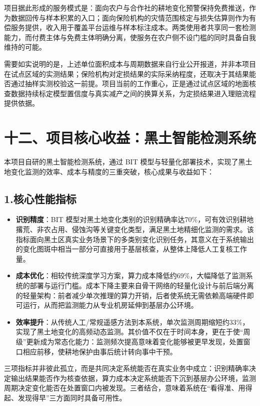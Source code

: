 \documentclass[12pt, a4paper]{ctexart}
\begin{document}
项目据此形成的服务模式是：面向农户与合作社的耕地变化预警保持免费推送，作为数据回传与样本积累的入口；面向保险机构的灾情范围核定与损失估算则作为有偿服务提供，收入用于覆盖平台运维与样本标注成本。两类使用者共享同一套检测能力，而付费主体与免费主体明确分离，使服务在农户侧不设门槛的同时具备自我维持的可能。

需要如实说明的是，上述单位面积成本与周期数据来自行业公开报道，并非本项目在试点区域的实测结果；保险机构对定损结果的实际采纳程度，还取决于其结果能否通过抽样实测校验这一前提。项目当前的工作重心，正是通过试点区域的地面核查数据持续标定模型置信度与真实减产之间的换算关系，为定损结果进入理赔流程提供依据。

\section{十二、项目核心收益：黑土智能检测系统}

本项目自研的黑土智能检测系统，通过 BIT 模型与轻量化部署技术，实现了黑土地变化监测的效率、成本与精度的三重突破，核心成果与收益如下：

\subsection{1.核心性能指标}

\begin{itemize}
  \item \textbf{识别精度}：BIT 模型对黑土地变化类别的识别精确率达70\%，可有效识别耕地撂荒、非农占用、侵蚀沟等关键变化类型，满足黑土地精细化监测的需求。该指标面向黑土区真实业务场景下的多类别变化识别任务，其意义在于系统输出的变化图斑中相当一部分可直接用于基层核查，从整体上降低人工复核工作量。
  \item \textbf{成本优化}：相较传统深度学习方案，算力成本降低约69\%，大幅降低了监测系统的部署与运行门槛。成本下降主要来自骨干网络的轻量化设计与前后端分离的轻量架构：前者减少单次推理的算力开销，后者使系统无需依赖高端硬件即可运行，从而把监测能力从专业机房延伸到基层办公环境。
  \item \textbf{效率提升}：从传统人工/常规遥感方法到本系统，单次监测周期缩短约33\%，实现了黑土地变化的高频动态监测。其价值不仅在于时间本身，更在于使“周级”更新成为常态化能力：监测频次提高意味着变化能够被更早发现，处置窗口相应前移，使耕地保护由事后统计转向事中干预。
\end{itemize}

三项指标并非彼此孤立，而是共同决定系统能否在真实业务中成立：识别精确率决定输出结果能否作为核查依据，算力成本决定系统能否下沉到基层办公环境，监测周期决定变化能否在处置窗口内被发现。三者结合，意味着系统在“看得准、用得起、发现得早”三方面同时具备可用性。
\end{document}
